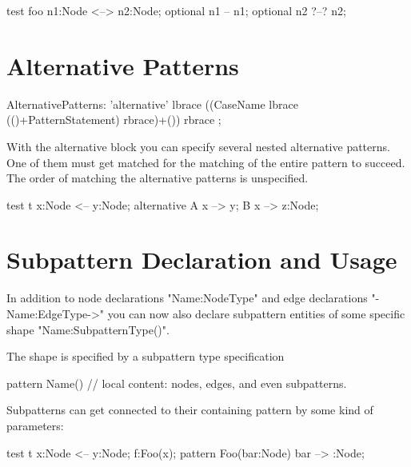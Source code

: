 \begin{example}
  \begin{grgen}
test foo {
  n1:Node <--> n2:Node;
  optional {
    n1 -- n1;
  }
  optional {
    n2 ?--? n2;
  }
}
  \end{grgen}
\end{example}


\section{Alternative Patterns}
\label{alternative}

\begin{rail}  
  AlternativePatterns: 
    'alternative' lbrace ((CaseName lbrace (()+PatternStatement) rbrace)+()) rbrace
    ;
\end{rail}

With the alternative block you can specify several nested alternative
patterns. One of them must get matched for the matching of the entire pattern
to succeed. The order of matching the alternative patterns is unspecified.

\begin{example}
  \begin{grgen}
test t {
  x:Node <-- y:Node;
  alternative {
    A {
      x --> y;
    }
    B {
      x --> z:Node;
    }
  }
}
  \end{grgen}
\end{example}


\section{Subpattern Declaration and Usage}
\label{subpattern}

In addition to node declarations "Name:NodeType" and edge declarations
"-Name:EdgeType->" you can now also declare subpattern entities of some
specific shape "Name:SubpatternType()".

The shape is specified by a subpattern type specification

pattern Name() {
  // local content: nodes, edges, and even subpatterns.
}

Subpatterns can get connected to their containing pattern 
by some kind of parameters:

\begin{example}
  \begin{grgen}
test t {
  x:Node <-- y:Node;
  f:Foo(x);
}
pattern Foo(bar:Node) {
  bar --> :Node;
}
  \end{grgen}
\end{example}

